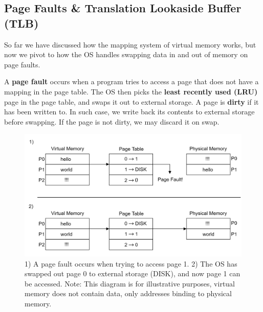 \newpage 

\subsection{Page Faults \& Translation Lookaside Buffer (TLB)}

So far we have discussed how the mapping system of virtual memory works, but now we pivot to how the OS handles swapping data in and out of memory on page faults.

\begin{Def}

    A \textbf{page fault} occurs when a program tries to access a page that does not have a mapping in the page table. 
    The OS then picks the \textbf{least recently used (LRU)} page in the page table, and swaps it out to external storage. A page is \textbf{dirty} if it has been written to. In 
    such case, we write back its contents to external storage before swapping. If the page is not dirty, we may discard it on swap.
\end{Def}

\vspace{-1em}
\begin{figure}[h]
    \centering
    \includegraphics[width=\textwidth]{Sections/virt/pagefault.png}
    
    \vspace{1em}
    \caption{
        1) A page fault occurs when trying to access page 1. 2) The OS has swapped out page 0 to external storage (DISK), and now page 1 can be accessed.
        Note: This diagram is for illustrative purposes, virtual memory does not contain data, only addresses binding to physical memory.
        }

    \label{fig:virt6}
\end{figure}

